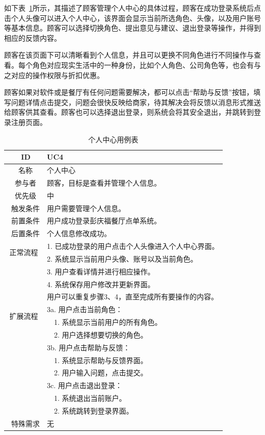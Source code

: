 如下表~\ref{table:uc3}所示，其描述了顾客管理个人中心的具体过程，顾客在成功登录系统后点击个人头像可以进入个人中心，该界面会显示当前所选角色、头像，以及用户账号等基本信息。顾客可以选择切换角色、提出意见与建议、退出登录等操作，并得到相应的反馈内容。

顾客在该页面下可以清晰看到个人信息，并且可以更换不同角色进行不同操作与查看。每个角色对应现实生活中的一种身份，比如个人角色、公司角色等，也会有与之对应的操作权限与折扣优惠。

顾客如果对软件或是餐厅有任何问题需要解决，都可以点击“帮助与反馈”按钮，填写问题详情点击提交，问题会很快反映给商家，待其解决会将反馈以消息形式推送给顾客供其查看。顾客也可以选择退出登录，则系统会将其安全退出，并跳转到登录注册页面。

\begin{table}[htbp!]
  \footnotesize
  \centering
  \caption{个人中心用例表}
  \vspace{2mm}
  \begin{tabular}{cp{11.5cm}}
   \hline
   \ ID & UC4 \\ 
   \hline
   \ 名称 & 个人中心 \\ 
   \hline
   \ 参与者 & 顾客，目标是查看并管理个人信息。 \\ 
   \hline
   \ 优先级 & 中 \\ 
   \hline
   \ 触发条件 & 用户需要管理个人信息。 \\ 
   \hline
   \ 前置条件 & 用户成功登录彭庆福餐厅点单系统。 \\ 
   \hline
   \ 后置条件 & 个人信息修改成功。 \\ 
   \hline
   \multirow{2}{*}{正常流程}
    & 1.	已成功登录的用户点击个人头像进入个人中心界面。\\
    & 2.	系统显示当前用户头像、账号以及当前角色。\\
    & 3.	用户查看详情并进行相应操作。\\
    & 4.	系统保存用户修改并更新界面。\\
    & 用户可以重复步骤3、4，直至完成所有要操作的内容。\\
   \hline
   \multirow{2}{*}{扩展流程}
    & 3a. 用户点击当前角色：\\
    & ~~1.	系统显示当前用户的所有角色。\\
    & ~~2.	用户选择想要切换的角色。\\
    & 3b. 用户点击帮助与反馈：\\
    & ~~1.	系统显示帮助与反馈界面。\\
    & ~~2.	用户输入问题，点击提交。\\
    & 3c. 用户点击退出登录：\\
    & ~~1.	系统退出当前账户。\\
    & ~~2.	系统跳转到登录界面。\\
  \hline
  \ 特殊需求 & 无 \\ 
  \hline
  \end{tabular}
  \label{table:uc3}
\end{table}


